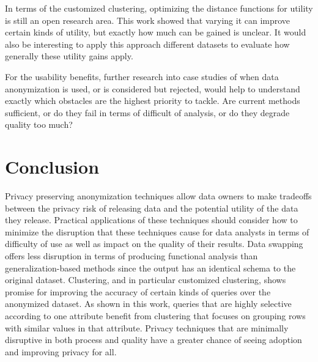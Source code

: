 In terms of the customized clustering, optimizing the distance functions for utility is still an open research area. This work showed that varying it can improve certain kinds of utility, but exactly how much can be gained is unclear. It would also be interesting to apply this approach different datasets to evaluate how generally these utility gains apply.

For the usability benefits, further research into case studies of when data anonymization is used, or is considered but rejected, would help to understand exactly which obstacles are the highest priority to tackle. Are current methods sufficient, or do they fail in terms of difficult of analysis, or do they degrade quality too much?

\section{Conclusion}
Privacy preserving anonymization techniques allow data owners to make tradeoffs between the privacy risk of releasing data and the potential utility of the data they release. Practical applications of these techniques should consider how to minimize the disruption that these techniques cause for data analysts in terms of difficulty of use as well as impact on the quality of their results. Data swapping offers less disruption in terms of producing functional analysis than generalization-based methods since the output has an identical schema to the original dataset. Clustering, and in particular customized clustering, shows promise for improving the accuracy of certain kinds of queries over the anonymized dataset. As shown in this work, queries that are highly selective according to one attribute benefit from clustering that focuses on grouping rows with similar values in that attribute. Privacy techniques that are minimally disruptive in both process and quality have a greater chance of seeing adoption and improving privacy for all.



% 





